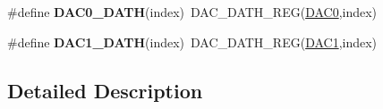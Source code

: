 \begin{DoxyCompactItemize}
\item 
\#define {\bfseries D\+A\+C0\+\_\+\+D\+A\+TH}(index)~D\+A\+C\+\_\+\+D\+A\+T\+H\+\_\+\+R\+EG(\hyperlink{group__DAC__Peripheral__Access__Layer_gadfe0025fe66918c644e110c3b055c955}{D\+A\+C0},index)\hypertarget{group__DAC__Register__Accessor__Macros_ga0c1025944a54ab896169911f32453cf1}{}\label{group__DAC__Register__Accessor__Macros_ga0c1025944a54ab896169911f32453cf1}

\item 
\#define {\bfseries D\+A\+C1\+\_\+\+D\+A\+TH}(index)~D\+A\+C\+\_\+\+D\+A\+T\+H\+\_\+\+R\+EG(\hyperlink{group__DAC__Peripheral__Access__Layer_gaffb5ff8779fa698f3c7165a617d56e4f}{D\+A\+C1},index)\hypertarget{group__DAC__Register__Accessor__Macros_ga58ff47a80b90d81ea8c86d2bccfa3a77}{}\label{group__DAC__Register__Accessor__Macros_ga58ff47a80b90d81ea8c86d2bccfa3a77}

\end{DoxyCompactItemize}


\subsection{Detailed Description}
